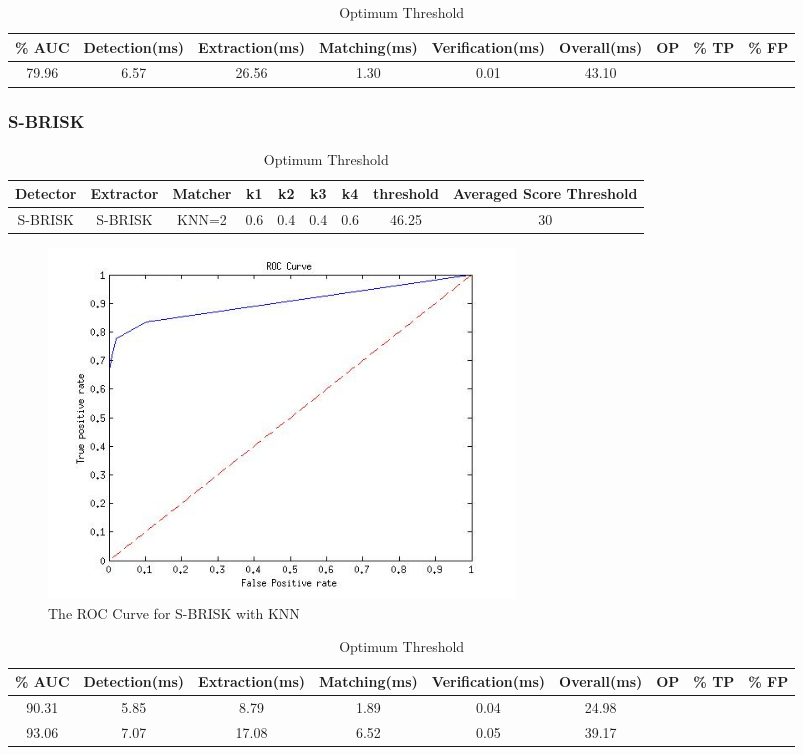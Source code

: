 \documentclass{article}
\begin{document}
\begin{table}
\caption{Optimum Threshold}
\begin{tabular}{|c|c|c|c|c|c|c|c|c|}
\hline 
\% AUC & Detection(ms) & Extraction(ms) & Matching(ms) & Verification(ms) & Overall(ms) & OP & \% TP & \% FP\tabularnewline
\hline 
\hline 
79.96 & 6.57 & 26.56 & 1.30 & 0.01 & 43.10 &  &  & \tabularnewline
\hline 
\end{tabular}
\label{tab:sbrisk}
\end{table}




\subsubsection{S-BRISK}
\label{sec:sbriskResults}
\begin{table}
\caption{Optimum Threshold}
\begin{tabular}{|c|c|c|c|c|c|c|c|c|}
\hline 
Detector & Extractor & Matcher & k1 & k2 & k3 & k4 & threshold & Averaged Score Threshold\tabularnewline
\hline 
\hline 
S-BRISK & S-BRISK & KNN=2 & 0.6 & 0.4 & 0.4 & 0.6 & 46.25 & 30\tabularnewline
\hline 
\end{tabular}
\label{tab:sbrisk}
\end{table}


\begin{figure}[h!]
	\centering
		\includegraphics[width=0.6\textwidth]{../Drawings/ROC_SBRISK_SBRISK_KNN.jpg}
	\caption{The ROC Curve for S-BRISK with KNN}
	\label{fig:sbriskroc}
\end{figure}

\begin{table}
\caption{Optimum Threshold}
\begin{tabular}{|c|c|c|c|c|c|c|c|c|}
\hline 
\% AUC & Detection(ms) & Extraction(ms) & Matching(ms) & Verification(ms) & Overall(ms) & OP & \% TP & \% FP\tabularnewline
\hline 
\hline 
90.31 & 5.85 & 8.79 & 1.89 & 0.04 & 24.98 &  &  & \tabularnewline
\hline 
93.06 & 7.07 & 17.08 & 6.52 & 0.05 & 39.17 &  &  & \tabularnewline
\hline 
\end{tabular}
\label{tab:sbrisk}
\end{table}
\end{document}
